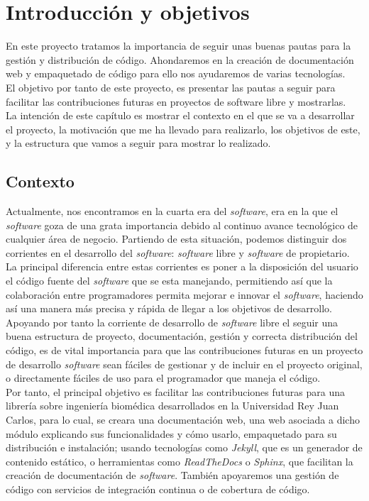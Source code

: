 \chapter{Introducción y objetivos}
\label{chap:intro}
En este proyecto tratamos la importancia de seguir unas buenas pautas para la gestión y distribución de código. Ahondaremos en la creación de documentación web y empaquetado de código para ello nos ayudaremos de varias tecnologías. \\
El objetivo por tanto de este proyecto, es presentar las pautas a seguir para facilitar las contribuciones futuras en proyectos de software libre y mostrarlas. \\
La intención de este capítulo es mostrar el contexto en el que se va a desarrollar el proyecto, la motivación que  me ha llevado para realizarlo, los objetivos de este, y la estructura que vamos a seguir para mostrar lo realizado.

\section{Contexto}
\label{sec:contex}
Actualmente, nos encontramos en la cuarta era del \emph{software}, era en la que el \emph{software} goza de una grata importancia debido al continuo avance tecnológico de cualquier área de negocio. Partiendo de esta situación, podemos distinguir dos corrientes en el desarrollo del \emph{software}: \emph{software} libre y \emph{software} de propietario. La principal diferencia entre estas corrientes es poner a la disposición del usuario el código fuente del \emph{software} que se esta manejando, permitiendo así que la colaboración entre programadores permita mejorar e innovar el \emph{software}, haciendo así una manera más precisa y rápida de llegar a los objetivos de desarrollo. Apoyando por tanto la corriente de desarrollo de \emph{software} libre el seguir una buena estructura de proyecto, documentación, gestión y correcta distribución del código, es de vital importancia para que las contribuciones futuras en un proyecto de desarrollo \emph{software} sean fáciles de gestionar y de incluir en el proyecto original, o directamente fáciles de uso para el programador que maneja el código. \\ 

Por tanto, el principal objetivo es facilitar las contribuciones futuras para una librería sobre ingeniería biomédica desarrollados en la Universidad Rey Juan Carlos, para lo cual, se creara una documentación web, una web asociada a dicho módulo explicando sus funcionalidades y cómo usarlo, empaquetado para su distribución e instalación; usando tecnologías como \emph{Jekyll}, que es un generador de contenido estático, o herramientas como \emph{ReadTheDocs} o \emph{Sphinx}, que facilitan la creación de documentación de \emph{software}. También apoyaremos una gestión de código con servicios de integración continua o de cobertura de código.



